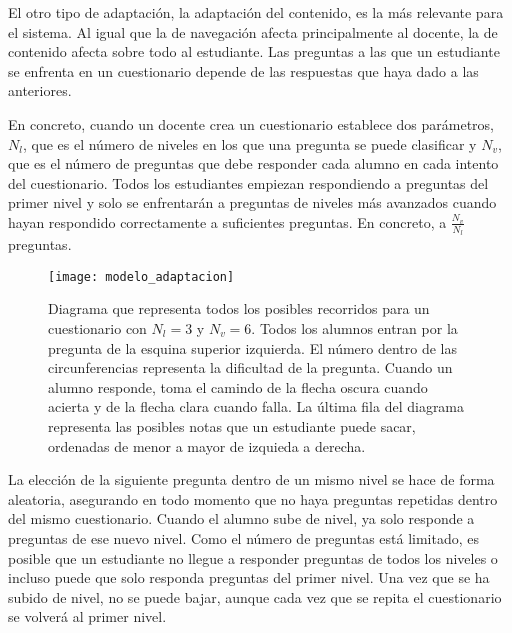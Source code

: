 
El otro tipo de adaptación, la adaptación del contenido, es la más relevante para el sistema. Al igual que la de navegación afecta principalmente al docente, la de contenido afecta sobre todo al estudiante. Las preguntas a las que un estudiante se enfrenta en un cuestionario depende de las respuestas que haya dado a las anteriores.

En concreto, cuando un docente crea un cuestionario establece dos parámetros, $N_l$, que es el número de niveles en los que una pregunta se puede clasificar y $N_v$, que es el número de preguntas que debe responder cada alumno en cada intento del cuestionario. Todos los estudiantes empiezan respondiendo a preguntas del primer nivel y solo se enfrentarán a preguntas de niveles más avanzados cuando hayan respondido correctamente a suficientes preguntas. En concreto, a $\frac{N_v}{N_l}$ preguntas.

\begin{figure}[htp!]
	\centering
	\texttt{[image: modelo\_adaptacion]}
	\caption[Modelo de adpatación]{Diagrama que representa todos los posibles recorridos para un cuestionario con $N_l = 3$ y $N_v = 6$. Todos los alumnos entran por la pregunta de la esquina superior izquierda. El número dentro de las circunferencias representa la dificultad de la pregunta. Cuando un alumno responde, toma el camindo de la flecha oscura cuando acierta y de la flecha clara cuando falla. La última fila del diagrama representa las posibles notas que un estudiante puede sacar, ordenadas de menor a mayor de izquieda a derecha.}
	\label{fig:modelo de adaptacion}
\end{figure}

La elección de la siguiente pregunta dentro de un mismo nivel se hace de forma aleatoria, asegurando en todo momento que no haya preguntas repetidas dentro del mismo cuestionario. Cuando el alumno sube de nivel, ya solo responde a preguntas de ese nuevo nivel. Como el número de preguntas está limitado, es posible que un estudiante no llegue a responder preguntas de todos los niveles o incluso puede que solo responda preguntas del primer nivel. Una vez que se ha subido de nivel, no se puede bajar, aunque cada vez que se repita el cuestionario se volverá al primer nivel.

